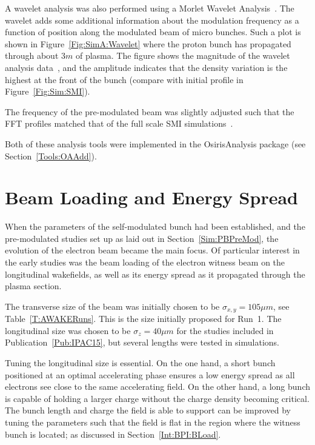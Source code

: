 A wavelet analysis was also performed using a Morlet Wavelet Analysis~\cite{goupillaud:1984,bernardino:2005}.
The wavelet adds some additional information about the modulation frequency as a function of position along the modulated beam of micro bunches.
Such a plot is shown in Figure~\ref{Fig:SimA:Wavelet} where the proton bunch has propagated through about $3\unit{m}$ of plasma.
The figure shows the magnitude of the wavelet analysis data~\cite{lee:1994}, and the amplitude indicates that the density variation is the highest at the front of the bunch (compare with initial profile in Figure~\ref{Fig:Sim:SMI}).

The frequency of the pre-modulated beam was slightly adjusted such that the FFT profiles matched that of the full scale SMI simulations~\cite{berglyd_olsen:2015}.

Both of these analysis tools were implemented in the OsirisAnalysis package (see Section~\ref{Tools:OAAdd}).

\section{Beam Loading and Energy Spread}
\label{SimA:BLoad}

When the parameters of the self-modulated bunch had been established, and the pre-modulated studies set up as laid out in Section~\ref{Sim:PBPreMod}, the evolution of the electron beam became the main focus.
Of particular interest in the early studies was the beam loading of the electron witness beam on the longitudinal wakefields, as well as its energy spread as it propagated through the plasma section.

The transverse size of the beam was initially chosen to be $\sigma_{x,y}=105\unit{\mu m}$, see Table~\ref{T:AWAKERuns}.
This is the size initially proposed for Run~1.
The longitudinal size was chosen to be $\sigma_{z}=40\unit{\mu m}$ for the studies included in Publication~\ref{Pub:IPAC15}, but several lengths were tested in simulations.

Tuning the longitudinal size is essential.
On the one hand, a short bunch positioned at an optimal accelerating phase ensures a low energy spread as all electrons see close to the same accelerating field.
On the other hand, a long bunch is capable of holding a larger charge without the charge density becoming critical.
The bunch length and charge the field is able to support can be improved by tuning the parameters such that the field is flat in the region where the witness bunch is located; as discussed in Section~\ref{Int:BPI:BLoad}.

